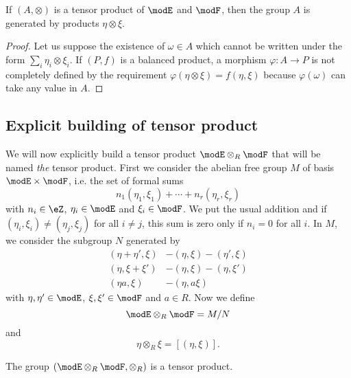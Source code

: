 \begin{proposition}
	If $(A,\otimes)$ is a tensor product of $\modE$ and $\modF$, then the group $A$ is generated by products $\eta\otimes\xi$.
\end{proposition}

\begin{proof}
	Let us suppose the existence of $\omega\in A$ which cannot be written under the form $\sum_i\eta_i\otimes\xi_i$. If $(P,f)$ is a balanced product, a morphism $\varphi\colon A\to P$ is not completely defined by the requirement $\varphi(\eta\otimes\xi)=f(\eta,\xi)$ because $\varphi(\omega)$ can take any value in $A$.

\end{proof}

\subsection{Explicit building of tensor product}

We will now explicitly build a tensor product $\modE\otimes_R\modF$ that will be named \emph{the} tensor product. First we consider the abelian free group $M$ of basis $\modE\times\modF$, i.e. the set of formal sums
\[
	n_1(\eta_1,\xi_1)+\cdots+n_r(\eta_r,\xi_r)
\]
with $n_i\in\eZ$, $\eta_i\in\modE$ and $\xi_i\in\modF$. We put the usual addition and if $(\eta_i,\xi_i)\neq(\eta_j,\xi_j)$ for all $i\neq j$, this sum is zero only if $n_i=0$ for all $i$. In $M$, we consider the subgroup $N$ generated by
\begin{subequations}
	\begin{align}
		(\eta+\eta',\xi) & -(\eta,\xi)-(\eta',\xi) \\
		(\eta,\xi+\xi')  & -(\eta,\xi)-(\eta,\xi') \\
		(\eta a,\xi)     & -(\eta, a\xi)
	\end{align}
\end{subequations}
with $\eta,\eta'\in\modE$, $\xi,\xi'\in\modF$ and $a\in R$. Now we define
\begin{equation}
	\modE\otimes_R\modF=M/N
\end{equation}
and
\begin{equation}
	\eta\otimes_R\xi=[(\eta,\xi)].
\end{equation}

\begin{proposition}
	The group $(\modE\otimes_R\modF,\otimes_R)$ is a tensor product.
\end{proposition}


